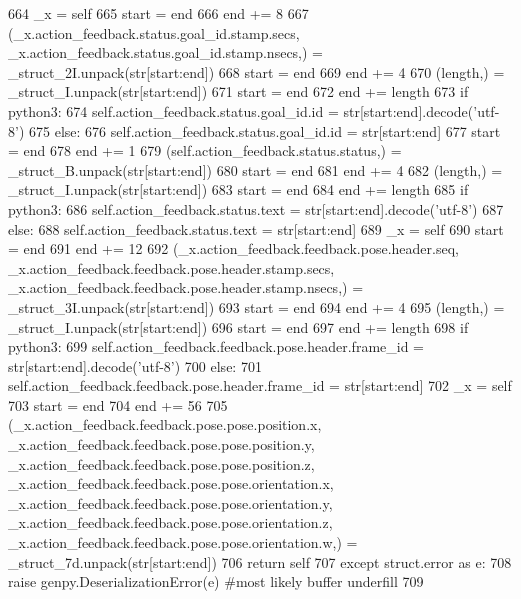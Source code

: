 \begin{DoxyCode}
664       \_x = self
665       start = end
666       end += 8
667       (\_x.action\_feedback.status.goal\_id.stamp.secs, \_x.action\_feedback.status.goal\_id.stamp.nsecs,) = 
      \_struct\_2I.unpack(str[start:end])
668       start = end
669       end += 4
670       (length,) = \_struct\_I.unpack(str[start:end])
671       start = end
672       end += length
673       \textcolor{keywordflow}{if} python3:
674         self.action\_feedback.status.goal\_id.id = str[start:end].decode(\textcolor{stringliteral}{'utf-8'})
675       \textcolor{keywordflow}{else}:
676         self.action\_feedback.status.goal\_id.id = str[start:end]
677       start = end
678       end += 1
679       (self.action\_feedback.status.status,) = \_struct\_B.unpack(str[start:end])
680       start = end
681       end += 4
682       (length,) = \_struct\_I.unpack(str[start:end])
683       start = end
684       end += length
685       \textcolor{keywordflow}{if} python3:
686         self.action\_feedback.status.text = str[start:end].decode(\textcolor{stringliteral}{'utf-8'})
687       \textcolor{keywordflow}{else}:
688         self.action\_feedback.status.text = str[start:end]
689       \_x = self
690       start = end
691       end += 12
692       (\_x.action\_feedback.feedback.pose.header.seq, \_x.action\_feedback.feedback.pose.header.stamp.secs, 
      \_x.action\_feedback.feedback.pose.header.stamp.nsecs,) = \_struct\_3I.unpack(str[start:end])
693       start = end
694       end += 4
695       (length,) = \_struct\_I.unpack(str[start:end])
696       start = end
697       end += length
698       \textcolor{keywordflow}{if} python3:
699         self.action\_feedback.feedback.pose.header.frame\_id = str[start:end].decode(\textcolor{stringliteral}{'utf-8'})
700       \textcolor{keywordflow}{else}:
701         self.action\_feedback.feedback.pose.header.frame\_id = str[start:end]
702       \_x = self
703       start = end
704       end += 56
705       (\_x.action\_feedback.feedback.pose.pose.position.x, \_x.action\_feedback.feedback.pose.pose.position.y, 
      \_x.action\_feedback.feedback.pose.pose.position.z, \_x.action\_feedback.feedback.pose.pose.orientation.x, 
      \_x.action\_feedback.feedback.pose.pose.orientation.y, \_x.action\_feedback.feedback.pose.pose.orientation.z, 
      \_x.action\_feedback.feedback.pose.pose.orientation.w,) = \_struct\_7d.unpack(str[start:end])
706       \textcolor{keywordflow}{return} self
707     \textcolor{keywordflow}{except} struct.error \textcolor{keyword}{as} e:
708       \textcolor{keywordflow}{raise} genpy.DeserializationError(e) \textcolor{comment}{#most likely buffer underfill}
709 
\end{DoxyCode}
